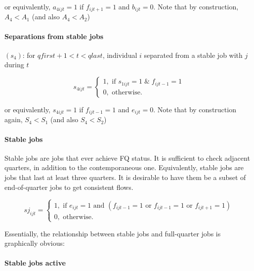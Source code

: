 or equivalently, $a_{4ijt}=1$ if $f_{ijt+1}=1$ and $b_{ijt}=0$. Note that
by construction, $A_4<A_1$ (and also $A_4<A_2$)

\paragraph{Separations from stable jobs}


$\left( s_{4}\right) $: for $qfirst+1<t<qlast$, individual $i$ separated
from a stable job with $j$ during $t$ 

\begin{equation*}
s_{4ijt}=\left\{ 
\begin{array}{l}
1,\text{ if }s_{1ijt}=1\;\&\;f_{ijt-1}=1 \\ 
0,\text{ otherwise.}%
\end{array}%
\right.   
\end{equation*}


or equivalently, $s_{4ijt}=1$ if $f_{ijt-1}=1$ and $e_{ijt}=0$. Note that
by construction again, $S_4<S_1$ (and also $S_4<S_2$)

\paragraph{Stable jobs}

Stable jobs are jobs that ever achieve FQ status. It is sufficient to check
adjacent quarters, in addition to the contemporaneous one. Equivalently,
stable jobs are jobs that last at least three quarters. It is desirable to
have them be a subset of end-of-quarter jobs to get consistent flows.



\begin{equation}
sj_{ijt}=\left\{ 
\begin{array}{l}
1,\text{ if }e_{ijt}=1 \text{ and }
  \left ( 
      f_{ijt-1} = 1 
      \text{ or } f_{ijt-1} = 1
      \text{ or } f_{ijt+1} = 1
   \right )
   \\ 
0,\text{ otherwise.}%
\end{array}%
\right.   \label{eq:sjijt}
\end{equation}

Essentially, the relationship between stable jobs and full-quarter jobs is
graphically obvious:

\paragraph{Stable jobs active}

